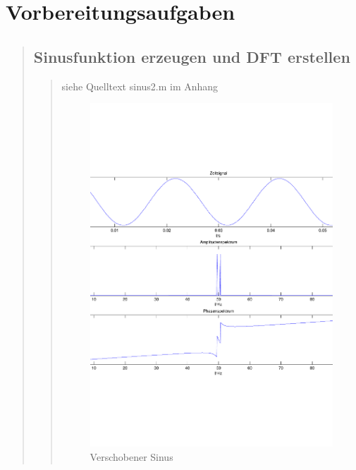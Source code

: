 \section{Vorbereitungsaufgaben}
\begin{quote}
    \subsection{Sinusfunktion erzeugen und DFT erstellen}
    \begin{quote}
        siehe Quelltext sinus2.m im Anhang
        \begin{figure}[H]
        \centering
            \includegraphics[scale=0.5, trim = 0cm 0cm 0cm 0cm, clip]{./Bilder/VerschobenerSinusAufgabe1}
                \caption{Verschobener Sinus}
                \label{fig:./Bilder/VerschobenerSinusAufgabe1}
        \end{figure}
    

\end{quote}
\end{quote}
